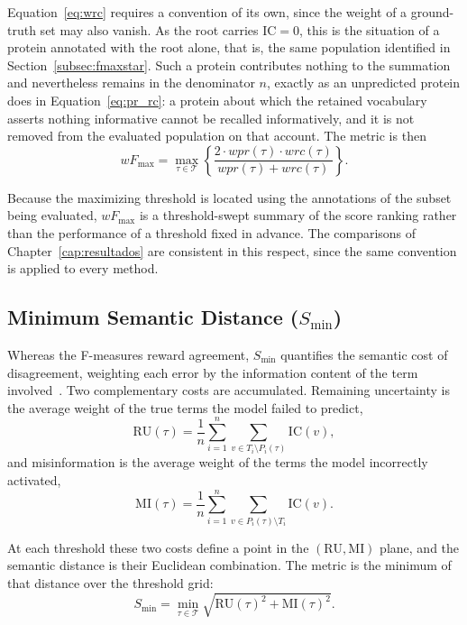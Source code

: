 \documentclass[Ingles]{ic-tese-v3}
\begin{document}
Equation~\ref{eq:wrc} requires a convention of its own, since the weight of a
ground-truth set may also vanish. As the root carries $\mathrm{IC} = 0$, this is
the situation of a protein annotated with the root alone, that is, the same
population identified in Section~\ref{subsec:fmaxstar}. Such a protein
contributes nothing to the summation and nevertheless remains in the denominator
$n$, exactly as an unpredicted protein does in Equation~\ref{eq:pr_rc}: a protein
about which the retained vocabulary asserts nothing informative cannot be
recalled informatively, and it is not removed from the evaluated population on
that account. The metric is then
\begin{equation}
\label{eq:wfmax}
wF_{\max} = \max_{\tau \in \mathcal{T}}
\left\{
\frac{2 \cdot wpr(\tau) \cdot wrc(\tau)}{wpr(\tau) + wrc(\tau)}
\right\}.
\end{equation}

Because the maximizing threshold is located using the annotations of the subset
being evaluated, $wF_{\max}$ is a threshold-swept summary of the score ranking
rather than the performance of a threshold fixed in advance. The comparisons of
Chapter~\ref{cap:resultados} are consistent in this respect, since the same
convention is applied to every method.

\subsection{Minimum Semantic Distance (\texorpdfstring{$S_{\min}$}{Smin})}
\label{subsec:smin}

Whereas the F-measures reward agreement, $S_{\min}$ quantifies the semantic cost
of disagreement, weighting each error by the information content of the term
involved~\cite{radivojac2013large}. Two complementary costs are accumulated.
Remaining uncertainty is the average weight of the true terms the model failed to
predict,
\begin{equation}
\label{eq:ru}
\mathrm{RU}(\tau) = \frac{1}{n} \sum_{i=1}^{n}
\sum_{v \in T_i \setminus P_i(\tau)} \mathrm{IC}(v),
\end{equation}
\noindent and misinformation is the average weight of the terms the model incorrectly
activated,
\begin{equation}
\label{eq:mi}
\mathrm{MI}(\tau) = \frac{1}{n} \sum_{i=1}^{n}
\sum_{v \in P_i(\tau) \setminus T_i} \mathrm{IC}(v).
\end{equation}

At each threshold these two costs define a point in the $(\mathrm{RU},
\mathrm{MI})$ plane, and the semantic distance is their Euclidean combination.
The metric is the minimum of that distance over the threshold grid:
\begin{equation}
\label{eq:smin}
S_{\min} = \min_{\tau \in \mathcal{T}}
\sqrt{\mathrm{RU}(\tau)^{2} + \mathrm{MI}(\tau)^{2}}.
\end{equation}
\end{document}
